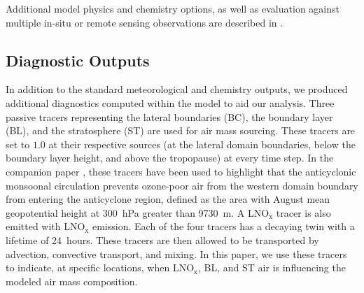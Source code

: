 Additional model physics and chemistry options, as well as evaluation against
multiple in-situ or remote sensing observations are described in
\citet[][manuscript in preparation]{Wong:2014xx}. %

\subsection{Diagnostic Outputs}

In addition to the standard meteorological and chemistry outputs, we produced additional
diagnostics computed within the model to aid our analysis.
Three passive tracers representing the lateral boundaries (BC), the boundary layer (BL), and the
stratosphere (ST) are used for air mass sourcing. These tracers are set to $1.0$ at their respective
sources (at the lateral domain boundaries, below the boundary layer height, and above
the tropopause) at every time step. In the companion paper \citep{Wong:2014xx}, these
tracers have been used to highlight that the anticyclonic monsoonal circulation prevents
ozone-poor air from the western domain boundary from entering the anticyclone region,
defined as the area with August mean geopotential height at 300~hPa greater than  9730~m.
A LNO$_\mathrm{x}$ tracer is also emitted with LNO$_\mathrm{x}$ emission. Each of the four tracers has a
decaying twin with a lifetime of 24~hours. These tracers are then allowed to be
transported by advection, convective transport, and mixing. In this paper, we use these
tracers to indicate, at specific locations, when $\mathrm{LNO_x}$, BL, and ST air
is influencing the modeled air mass composition.

